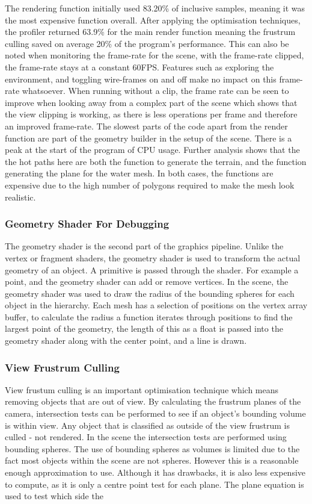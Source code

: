 \documentclass[conference]{acmsiggraph}
\begin{document}
The rendering function initially used 83.20\% of inclusive samples, meaning it was the most expensive function overall. After applying the optimisation techniques, the profiler returned 63.9\% for the main render function meaning the frustrum culling saved on average 20\% of the program's performance. This can also be noted when monitoring the frame-rate for the scene, with the frame-rate clipped, the frame-rate stays at a constant 60FPS. Features such as exploring the environment, and toggling wire-frames on and off make no impact on this frame-rate whatsoever. When running without a clip, the frame rate can be seen to improve when looking away from a complex part of the scene which shows that the view clipping is working, as there is less operations per frame and therefore an improved frame-rate. The slowest parts of the code apart from the render function are part of the geometry builder in the setup of the scene. There is a peak at the start of the program of CPU usage. Further analysis shows that the the hot paths here are both the function to generate the terrain, and the function generating the plane for the water mesh. In both cases, the functions are expensive due to the high number of polygons required to make the mesh look realistic. 


\subsubsection{Geometry Shader For Debugging}
The geometry shader is the second part of the graphics pipeline. Unlike the vertex or fragment shaders, the geometry shader is used to transform the actual geometry of an object. A primitive is passed through the shader. For example a point, and the geometry shader can add or remove vertices. In the scene, the geometry shader was used to draw the radius of the bounding spheres for each object in the hierarchy. Each mesh has a selection of positions on the vertex array buffer, to calculate the radius a function iterates through positions to find the largest point of the geometry, the length of this as a float is passed into the geometry shader along with the center point, and a line is drawn.

\subsubsection{View Frustrum Culling}
View frustum culling is an important optimisation technique which means removing objects that are out of view. By calculating the frustrum planes of the camera, intersection tests can be performed to see if an object's bounding volume is within view. Any object that is classified as outside of the view frustrum is culled - not rendered. In the scene the intersection tests are performed using bounding spheres. The use of bounding spheres as volumes is limited due to the fact most objects within the scene are not spheres. However this is a reasonable enough approximation to use. Although it has drawbacks, it is also less expensive to compute, as it is only a centre point test for each plane. The plane equation is used to test which side the 
\end{document}
